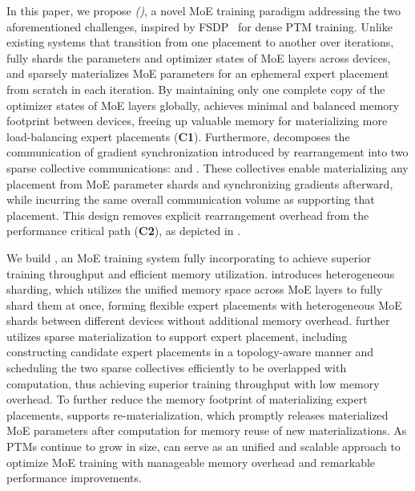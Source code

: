 In this paper, we propose \textit{\YYY (\yyy)}, a novel MoE training paradigm addressing the two aforementioned challenges, inspired by FSDP~\cite{zhao2023pytorchfsdp} for dense PTM training.
Unlike existing systems that transition from one placement to another over iterations, \yyy fully shards the parameters and optimizer states of MoE layers across devices, and sparsely materializes MoE parameters for an ephemeral expert placement from scratch in each iteration.
By maintaining only one complete copy of the optimizer states of MoE layers globally, \yyy achieves minimal and balanced memory footprint between devices, freeing up valuable memory for materializing more load-balancing expert placements (\textbf{C1}).
Furthermore, \yyy decomposes the \collar communication of gradient synchronization introduced by rearrangement into two sparse collective communications: \textit{\collsag} and \textit{\collsrs}. 
\newline These collectives enable materializing any placement from MoE parameter shards and synchronizing gradients afterward, while incurring the same overall communication volume as {\collar} supporting that placement.
This design removes explicit rearrangement overhead from the performance critical path (\textbf{C2}), as depicted in .





We build \xxx, an MoE training system fully incorporating \yyy to achieve superior training throughput and efficient memory utilization.
\xxx introduces heterogeneous sharding, which utilizes the unified memory space across MoE layers to fully shard them at once, 
forming flexible expert placements with heterogeneous MoE shards between different devices without additional memory overhead.
\xxx further utilizes sparse materialization to support expert placement, including constructing candidate expert placements in a topology-aware manner and scheduling the two sparse collectives efficiently to be overlapped with computation, thus achieving superior training throughput with low memory overhead.
To further reduce the memory footprint of materializing expert placements, \xxx supports re-materialization, which promptly releases materialized MoE parameters after computation for memory reuse of new materializations.
As PTMs continue to grow in size, \yyy can serve as an unified and scalable approach to optimize MoE training with manageable memory overhead and remarkable performance improvements.

